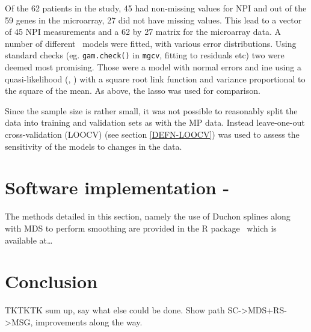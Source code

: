 Of the 62 patients in the study, 45 had non-missing values for NPI and out of the 59 genes in the microarray, 27 did not have missing values. This lead to a vector of 45 NPI measurements and a 62 by 27 matrix for the microarray data. A number of different \mdsds\ models were fitted, with various error distributions. Using standard checks (eg. \texttt{gam.check()} in \texttt{mgcv}, fitting to residuals etc) two were deemed most promising. Those were a model with normal errors and ine using a quasi-likelihood (\cite{quasi}, \cite{wood2008}) with a square root link function and variance proportional to the square of the mean. As above, the lasso was used for comparison.

Since the sample size is rather small, it was not possible to reasonably split the data into training and validation sets as with the MP data. Instead leave-one-out cross-validation (LOOCV) (see section \ref{DEFN-LOOCV}) was used to assess the sensitivity of the models to changes in the data.

%





\section{Software implementation - \mdspack}

The methods detailed in this section, namely the use of Duchon splines along with MDS to perform smoothing are provided in the \textsf{R} package \mdspack\ which is available at\ldots



\section{Conclusion}

TKTKTK sum up, say what else could be done. Show path SC->MDS+RS->MSG, improvements along the way.

